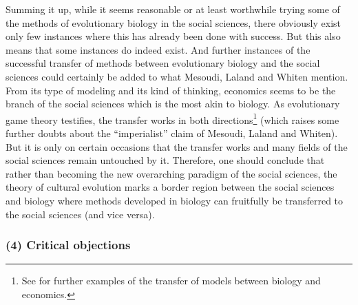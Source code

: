 Summing it up, while it seems reasonable or at least worthwhile trying some of
the methods of evolutionary biology in the social sciences, there obviously
exist only few instances where this has already been done with success.
But this also means that some instances do indeed exist. And further instances
of the successful transfer of methods between evolutionary biology and the
social sciences could certainly be added to what Mesoudi, Laland and Whiten
mention.  From its type of modeling and its kind of thinking, economics seems
to be the branch of the social sciences which is the most akin to biology.  As
evolutionary game theory testifies, the transfer works in both
directions\footnote{See \cite[]{arnold:2005} for further examples of the
  transfer of models between biology and economics.} (which raises some further
doubts about the ``imperialist'' claim of Mesoudi, Laland and Whiten).  But it
is only on certain occasions that the transfer works and many fields of the
social sciences remain untouched by it.  Therefore, one should conclude that
rather than becoming the new overarching paradigm of the social sciences, the
theory of cultural evolution marks a border region between the social sciences and
biology where methods developed in biology can fruitfully be transferred to the
social sciences (and vice versa).


\subsubsection{(4) Critical objections}

